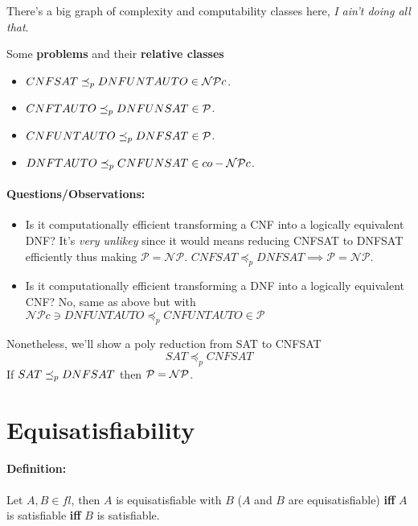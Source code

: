 	There's a big graph of complexity and computability classes here, \textit{I ain't doing all that}.\\

	\nn

	Some \textbf{problems} and their \textbf{relative classes}
	\begin{itemize}
		\item $CNFSAT \preceq_p DNFUNTAUTO \in \mathcal{NP} c$.\\

		\item $CNFTAUTO \preceq_p DNFUNSAT \in \mathcal{P}$.\\

		\item $CNFUNTAUTO \preceq_p DNFSAT \in \mathcal{P}$.\\

		\item $DNFTAUTO \preceq_p CNFUNSAT \in co-\mathcal{NP} c$.\\

	\end{itemize}

	\paragraph{Questions/Observations: }
	\begin{itemize}
		\item Is it computationally efficient transforming a CNF into a logically equivalent DNF? It's \textit{very unlikey} since it would means reducing CNFSAT to DNFSAT efficiently thus making $\mathcal{P} = \mathcal{NP}$. $CNFSAT \preceq_p DNFSAT \implies \mathcal{P} = \mathcal{NP}$.\\

		\item Is it computationally efficient transforming a DNF into a logically equivalent CNF? No, same as above but with $\mathcal{NP}c \ni DNFUNTAUTO \preceq_p CNFUNTAUTO \in \mathcal{P}$
	\end{itemize}

	Nonetheless, we'll show a poly reduction from SAT to CNFSAT
	$$ SAT \preceq_p CNFSAT $$
	If $SAT \preceq_p DNFSAT$ then $\mathcal{P} = \mathcal{NP}$.\\

	\newpage

	\section{Equisatisfiability}

	\paragraph{Definition:} Let $A,B \in fl$, then $A$ is equisatisfiable with $B$ ($A$ and $B$ are equisatisfiable) \textbf{iff} $A$ is satisfiable \textbf{iff} $B$ is satisfiable.\\

